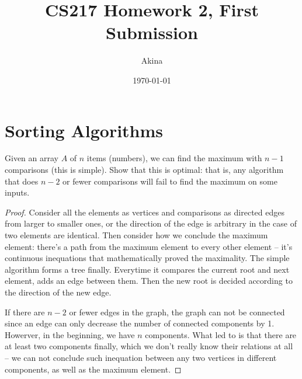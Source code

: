 \documentclass[11pt,a4paper,oneside]{article}
\renewcommand{\hwtitle} {CS217 Homework 2, First Submission}
\renewcommand{\hwauthor}{Akina}
\renewcommand{\hwdate}{\today}
\begin{document}
\title{\hwtitle}
\author{\hwauthor}
\date{\hwdate}
\maketitle

\section*{Sorting Algorithms}
\begin{problem}{1}
	\statement
	Given an array $A$ of $n$ items (numbers), we can find the maximum with $n-1$ comparisons (this is simple).
	Show that this is optimal: that is, any algorithm that does $n-2$ or fewer comparisons will fail to find the maximum 
	on some inputs.
	\solution
	\begin{proof}
		Consider all the elements as vertices and comparisons as directed edges from larger to smaller ones, or the direction of the edge is arbitrary in the case of two elements are identical. Then consider how we conclude the maximum element: there's a path from the maximum element to every other element -- it's continuous inequations that mathematically proved the maximality.
		The simple algorithm forms a tree finally. Everytime it compares the current root and next element, adds an edge between them. Then the new root is decided according to the direction of the new edge.

		If there are $n - 2$ or fewer edges in the graph, the graph can not be connected since an edge can only decrease the number of connected components by 1. Howerver, in the beginning, we have $n$ components. What led to is that there are at least two components finally, which we don't really know their relations at all -- we can not conclude such inequation between any two vertices in different components, as well as the maximum element.
	\end{proof}
\end{problem}
\end{document}
